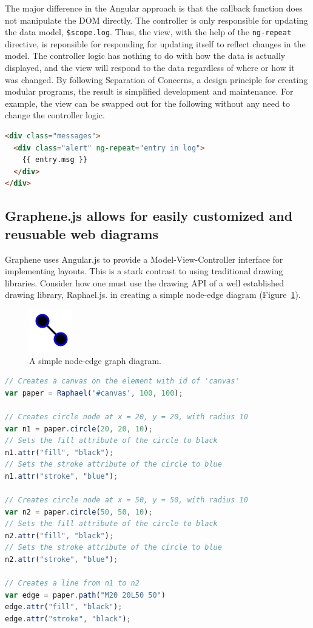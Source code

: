 The major difference in the Angular approach is that the callback function does not manipulate the DOM directly.
The controller is only responsible for updating the data model, \texttt{\$scope.log}.
Thus, the view, with the help of the \texttt{ng-repeat} directive, is reponsible for responding for updating itself to reflect changes in the model.
The controller logic has nothing to do with how the data is actually displayed, and the view will respond to the data regardless of where or how it was changed.
By following Separation of Concerns, a design principle for creating modular programs, the result is simplified development and maintenance.
For example, the view can be swapped out for the following without any need to change the controller logic.

\begin{lstlisting}[language=html]
<div class="messages">
  <div class="alert" ng-repeat="entry in log">
    {{ entry.msg }}
  </div>
</div>
\end{lstlisting}


\subsection{Graphene.js allows for easily customized and reusuable web diagrams}

Graphene uses Angular.js to provide a Model-View-Controller \autocite{krasner1988description} interface for implementing layouts.
This is a stark contrast to using traditional drawing libraries.
Consider how one must use the drawing API of a well established drawing library, Raphael.js. \autocite{sencha2014raphael} in creating a simple node-edge diagram (Figure~\ref{fig:graphene-simple}).

\begin{figure}
  \centering
  \includegraphics[width=70px,natwidth=610,natheight=642]{images/graphene-simple-70x70.png}
  \caption{A simple node-edge graph diagram.}
  \label{fig:graphene-simple}
\end{figure}

\begin{lstlisting}[language=JavaScript]
// Creates a canvas on the element with id of 'canvas'
var paper = Raphael('#canvas', 100, 100);

// Creates circle node at x = 20, y = 20, with radius 10
var n1 = paper.circle(20, 20, 10);
// Sets the fill attribute of the circle to black
n1.attr("fill", "black");
// Sets the stroke attribute of the circle to blue
n1.attr("stroke", "blue");

// Creates circle node at x = 50, y = 50, with radius 10
var n2 = paper.circle(50, 50, 10);
// Sets the fill attribute of the circle to black
n2.attr("fill", "black");
// Sets the stroke attribute of the circle to blue
n2.attr("stroke", "blue");

// Creates a line from n1 to n2
var edge = paper.path("M20 20L50 50")
edge.attr("fill", "black");
edge.attr("stroke", "black");
\end{lstlisting}

